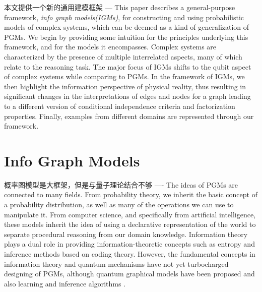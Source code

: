 \documentclass{article}
\theoremstyle{definition}
\theoremstyle{remark}
\theoremstyle{definition}
\begin{document}
\begin{CJK*}{UTF8}{gbsn}
本文提供一个新的通用建模框架 ---
This paper describes a general-purpose framework, \emph{info graph models(IGMs)}, for constructing and using probabilistic models of complex systems, which can be deemed as a kind of generalization of PGMs. We begin by providing some intuition for the principles underlying this framework, and for the models it encompasses. Complex systems are characterized by the presence of multiple interrelated aspects, many of which relate to the reasoning task. The major focus of IGMs shifts to the qubit aspect of complex systems while comparing to PGMs. In the framework of IGMs, we then highlight the information perspective of physical reality, thus resulting in significant changes in the interpretations of edges and nodes for a graph leading to a different version of conditional independence criteria and factorization properties. Finally, examples from different domains are represented through our framework.


\section{Info Graph Models}

概率图模型是大框架，但是与量子理论结合不够 ----
The ideas of PGMs are connected to many fields. From probability theory, we inherit the basic concept of a probability distribution, as well as many of the operations we can use to manipulate it. From computer science, and specifically from artificial intelligence, these models inherit the idea of using a declarative representation of the world to separate procedural reasoning from our domain knowledge. Information theory plays a dual role in providing information-theoretic concepts such as entropy and inference methods based on coding theory. However, the fundamental concepts in information theory and quantum mechanisms have not yet turbocharged designing of PGMs, although quantum graphical models have been proposed and also learning and inference algorithms \cite{srinivasan2018learning, leifer2008quantum, jouneghani2013review}. 


\end{CJK*}
\end{document}
